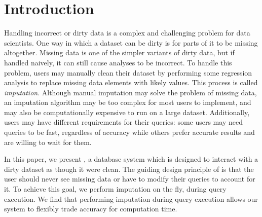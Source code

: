 \section{Introduction}

Handling incorrect or dirty data is a complex and challenging problem for data scientists.
One way in which a dataset can be dirty is for parts of it to be missing altogether.
Missing data is one of the simpler variants of dirty data, but if handled naively, it can still cause analyses to be incorrect.
To handle this problem, users may manually clean their dataset by performing some regression analysis to replace missing data elements with likely values.
This process is called \emph{imputation}.
Although manual imputation may solve the problem of missing data, an imputation algorithm may be too complex for most users to implement, and may also be computationally expensive to run on a large dataset.
Additionally, users may have different requirements for their queries: some users may need queries to be fast, regardless of accuracy while others prefer accurate results and are willing to wait for them.

In this paper, we present \ProjectName, a database system which is designed to interact with a dirty dataset as though it were clean.
The guiding design principle of \ProjectName is that the user should never see missing data or have to modify their queries to account for it.
To achieve this goal, we perform imputation on the fly, during query execution.
We find that performing imputation during query execution allows our system to flexibly trade accuracy for computation time.

